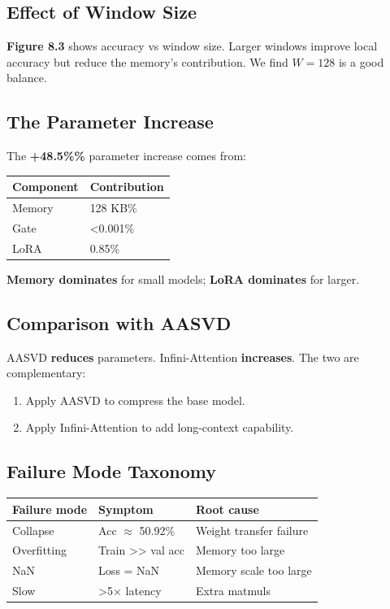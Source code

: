 \subsection{Effect of Window Size}

\textbf{Figure 8.3} shows accuracy vs window size. Larger windows improve 
local accuracy but reduce the memory's contribution. We find $W = 128$ 
is a good balance.

\subsection{The Parameter Increase}

The \textbf{+48.5\%\%} parameter increase comes from:

\begin{table}[H]
\centering
\small
\begin{tabular}{ll}
\toprule
\textbf{Component} & \textbf{Contribution} \\
\midrule
Memory & 128 KB\% \\
Gate & \textless{}0.001\% \\
LoRA & 0.85\% \\
\bottomrule
\end{tabular}
\end{table}

\textbf{Memory dominates} for small models; \textbf{LoRA dominates} for larger.

\subsection{Comparison with AASVD}

AASVD \textbf{reduces} parameters. Infini-Attention \textbf{increases}. The two are 
complementary:

\begin{enumerate}
\item Apply AASVD to compress the base model.
\item Apply Infini-Attention to add long-context capability.

\end{enumerate}
\subsection{Failure Mode Taxonomy}

\begin{table}[H]
\centering
\small
\begin{tabular}{lll}
\toprule
\textbf{Failure mode} & \textbf{Symptom} & \textbf{Root cause} \\
\midrule
Collapse & Acc $\approx$ 50.92\% & Weight transfer failure \\
Overfitting & Train \textgreater{}\textgreater{} val acc & Memory too large \\
NaN & Loss = NaN & Memory scale too large \\
Slow & \textgreater{}5$\times$ latency & Extra matmuls \\
\bottomrule
\end{tabular}
\end{table}


